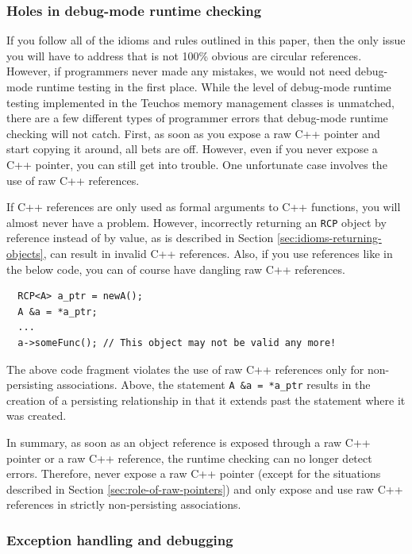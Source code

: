 \documentclass[pdf,ps2pdf,11pt]{SANDreport}
\begin{document}
%
{}\subsubsection{Holes in debug-mode runtime checking}
%

If you follow all of the idioms and rules outlined in this paper, then
the only issue you will have to address that is not 100\% obvious are
circular references.  However, if programmers never made any mistakes,
we would not need debug-mode runtime testing in the first place.
While the level of debug-mode runtime testing implemented in the
Teuchos memory management classes is unmatched, there are a few
different types of programmer errors that debug-mode runtime checking
will not catch.  First, as soon as you expose a raw C++ pointer and
start copying it around, all bets are off.  However, even if you never
expose a C++ pointer, you can still get into trouble.  One unfortunate
case involves the use of raw C++ references.

If C++ references are only used as formal arguments to C++ functions,
you will almost never have a problem.  However, incorrectly returning
an {}\texttt{RCP} object by reference instead of by value, as is
described in Section {}\ref{sec:idioms-returning-objects}, can result
in invalid C++ references.  Also, if you use references like in the
below code, you can of course have dangling raw C++ references.

{\small\begin{verbatim}
  RCP<A> a_ptr = newA();
  A &a = *a_ptr;
  ...
  a->someFunc(); // This object may not be valid any more!
\end{verbatim}}

The above code fragment violates the use of raw C++ references only
for non-persisting associations.  Above, the statement {}\texttt{A \&a
= *a\_ptr} results in the creation of a persisting relationship in that
it extends past the statement where it was created.

In summary, as soon as an object reference is exposed through a raw
C++ pointer or a raw C++ reference, the runtime checking can no longer
detect errors.  Therefore, never expose a raw C++ pointer (except for
the situations described in Section {}\ref{sec:role-of-raw-pointers})
and only expose and use raw C++ references in strictly non-persisting
associations.


%
{}\subsubsection{Exception handling and debugging}
%
\end{document}
